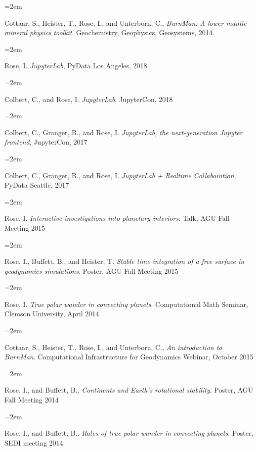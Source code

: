 \documentclass{scrartcl}
\newcommand{\Description}[1]{\hangindent=2em\hangafter=0\noindent\raggedright\footnotesize{#1}\par\normalsize\vspace{1em}} %
\begin{document}
\begin{cv}{\hspace{-4em} }

\Description{Cottaar, S., Heister, T., Rose, I., and Unterborn, C.. \textit{BurnMan: A lower mantle mineral physics toolkit}. Geochemistry, Geophysics, Geosystems, 2014.}


\vspace{0.5em} %



\noindent{}\vspace{1em}


\vspace{1em} %

\Description{Rose, I. \textit{JupyterLab}, PyData Los Angeles, 2018}
\Description{Colbert, C., and Rose, I. \textit{JupyterLab}, JupyterCon, 2018}
\Description{Colbert, C., Granger, B., and Rose, I. \textit{JupyterLab, the next-generation Jupyter frontend}, JupyterCon, 2017}
\Description{Colbert, C., Granger, B., and Rose, I. \textit{JupyterLab + Realtime Collaboration}, PyData Seattle, 2017}
\Description{Rose, I. \textit{Interactive investigations into planetary interiors}. Talk, AGU Fall Meeting 2015}
\Description{Rose, I., Buffett, B., and Heister, T. \textit{Stable time integration of a free surface in geodynamics simulations}. Poster, AGU Fall Meeting 2015}
\Description{Rose, I. \textit{True polar wander in convecting planets}. Computational Math Seminar, Clemson University, April 2014}
\Description{Cottaar, S., Heister, T., Rose, I., and Unterborn, C., \textit{An introduction to BurnMan}. Computational Infrastructure for Geodynamics Webinar, October 2015}
\Description{Rose, I., and Buffett, B.. \textit{Continents and Earth's rotational stability}. Poster, AGU Fall Meeting 2014}
\Description{Rose, I., and Buffett, B.. \textit{Rates of true polar wander in convecting planets}. Poster, SEDI meeting 2014}



\date{}
\end{cv}
\end{document}
